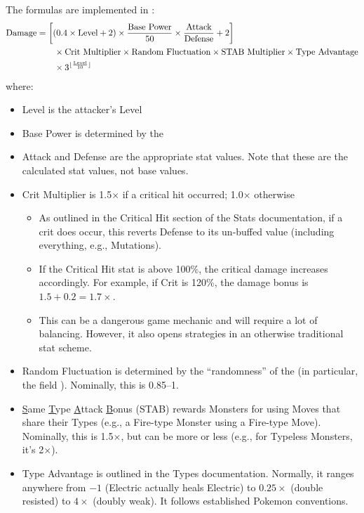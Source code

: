 The formulas are implemented in :
\begin{align*}
	\text{Damage} &= \left[\left(0.4\times \text{Level} + 2\right) \times \frac{\text{Base Power}}{50} \times \frac{\text{Attack}}{\text{Defense}} + 2\right]\\
		& \qquad \times \text{Crit Multiplier} \times \text{Random Fluctuation} \times \text{STAB Multiplier} \times \text{Type Advantage}\\
		& \qquad \times 3^{\lfloor\frac{\text{Level}}{10}\rfloor}
\end{align*}
where:
\begin{itemize}
	\item{Level is the attacker's Level}
	\item{Base Power is determined by the }
	\item{Attack and Defense are the appropriate stat values. Note that these are the calculated stat values, not base values.}
	\item{Crit Multiplier is 1.5$\times$ if a critical hit occurred; 1.0$\times$ otherwise
		\begin{itemize}
			\item{As outlined in the Critical Hit section of the Stats documentation, if a crit does occur, this reverts Defense to its un-buffed value (including everything, e.g., Mutations).}
			\item{If the Critical Hit stat is above 100\%, the critical damage increases accordingly. For example, if Crit is 120\%, the damage bonus is $1.5 + 0.2 = 1.7\times$.}
			\item{This can be a dangerous game mechanic and will require a lot of balancing. However, it also opens strategies in an otherwise traditional stat scheme.}
		\end{itemize}
	}
	\item{Random Fluctuation is determined by the ``randomness'' of the  (in particular, the field ). Nominally, this is 0.85--1.}
	\item{\ul{S}ame \ul{T}ype \ul{A}ttack \ul{B}onus (STAB) rewards Monsters for using Moves that share their Types (e.g., a Fire-type Monster using a Fire-type Move). Nominally, this is 1.5$\times$, but can be more or less (e.g., for Typeless Monsters, it's 2$\times$).}
	\item{Type Advantage is outlined in the Types documentation. Normally, it ranges anywhere from $-1$ (Electric actually heals Electric) to $0.25\times$ (double resisted) to $4\times$ (doubly weak). It follows established Pokemon conventions.}
\end{itemize}
